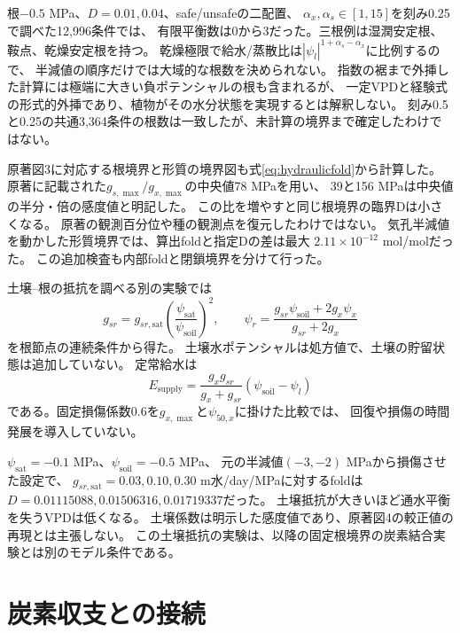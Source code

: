 \documentclass[a4paper,11pt]{ltjsarticle}
\begin{document}
根$-0.5$ MPa、$D=0.01,0.04$、safe/unsafeの二配置、
$\alpha_x,\alpha_s\in[1,15]$を刻み0.25で調べた12,996条件では、
有限平衡数は0から3だった。三根例は湿潤安定根、鞍点、乾燥安定根を持つ。
乾燥極限で給水/蒸散比は$|\psi_l|^{1+\alpha_s-\alpha_x}$に比例するので、
半減値の順序だけでは大域的な根数を決められない。
指数の裾まで外挿した計算には極端に大きい負ポテンシャルの根も含まれるが、
一定VPDと経験式の形式的外挿であり、植物がその水分状態を実現するとは解釈しない。
刻み0.5と0.25の共通3,364条件の根数は一致したが、未計算の境界まで確定したわけではない。

原著図3に対応する根境界と形質の境界図も式\eqref{eq:hydraulicfold}から計算した。
原著に記載された$g_{s,\max}/g_{x,\max}$の中央値78 MPaを用い、
39と156 MPaは中央値の半分・倍の感度値と明記した。
この比を増やすと同じ根境界の臨界Dは小さくなる。
原著の観測百分位や種の観測点を復元したわけではない。
気孔半減値を動かした形質境界では、算出foldと指定Dの差は最大
$2.11\times10^{-12}$ mol/molだった。
この追加検査も内部foldと閉鎖境界を分けて行った。

土壌--根の抵抗を調べる別の実験では
\begin{equation}
 g_{sr}=g_{sr,\mathrm{sat}}\left(\frac{\psi_{\mathrm{sat}}}{\psi_{\mathrm{soil}}}\right)^2,\qquad
 \psi_r=\frac{g_{sr}\psi_{\mathrm{soil}}+2g_x\psi_x}{g_{sr}+2g_x}
\end{equation}
を根節点の連続条件から得た。
土壌水ポテンシャルは処方値で、土壌の貯留状態は追加していない。
定常給水は
\begin{equation}
 E_{\mathrm{supply}}=\frac{g_xg_{sr}}{g_x+g_{sr}}(\psi_{\mathrm{soil}}-\psi_l)
\end{equation}
である。固定損傷係数0.6を$g_{x,\max}$と$\psi_{50,x}$に掛けた比較では、
回復や損傷の時間発展を導入していない。

$\psi_{\mathrm{sat}}=-0.1$ MPa、$\psi_{\mathrm{soil}}=-0.5$ MPa、
元の半減値$(-3,-2)$ MPaから損傷させた設定で、
$g_{sr,\mathrm{sat}}=0.03,0.10,0.30$ m水/day/MPaに対するfoldは
$D=0.01115088,0.01506316,0.01719337$だった。
土壌抵抗が大きいほど通水平衡を失うVPDは低くなる。
土壌係数は明示した感度値であり、原著図4の較正値の再現とは主張しない。
この土壌抵抗の実験は、以降の固定根境界の炭素結合実験とは別のモデル条件である。

\section{炭素収支との接続}\label{sec:carbon}
\end{document}
